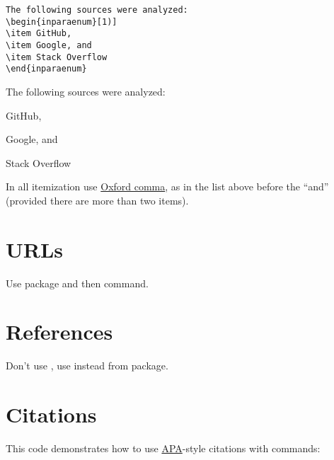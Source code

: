 \documentclass[12pt,nonacm,natbib=false]{acmart}
\begin{document}
\begin{multicols}{2}
\setlength{\parskip}{0pt}
\small
\raggedcolumns
\begin{verbatim}
The following sources were analyzed:
\begin{inparaenum}[1)]
\item GitHub,
\item Google, and
\item Stack Overflow
\end{inparaenum}
\end{verbatim}

\columnbreak

\raggedright
The following sources were
analyzed:
\begin{inparaenum}[1)]
\item GitHub,
\item Google, and
\item Stack Overflow
\end{inparaenum}
\end{multicols}

In all itemization use \href{https://en.wikipedia.org/wiki/Serial_comma}{Oxford comma}, as in the list above before the ``and'' (provided there are more than two items).

\section{URLs}

Use \href{https://ctan.org/pkg/href-ul}{} package and then  command.

\section{References}

Don't use , use  instead from \href{https://ctan.org/pkg/cleveref}{} package.

\section{Citations}

This code demonstrates how to use \href{https://libguides.murdoch.edu.au/APA}{APA}-style citations with \href{https://journals.aas.org/natbib/}{} commands:
\end{document}
